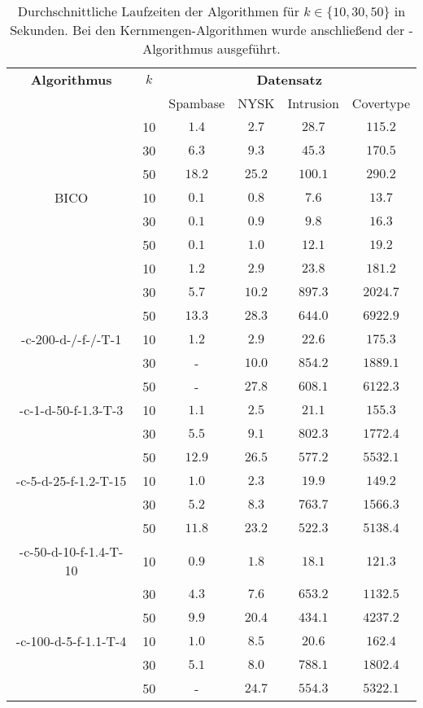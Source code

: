 \begin{table}[h]
\centering
\begin{tabular}{@{}cccccc@{}} \toprule
	\textbf{Algorithmus} & $k$ & \multicolumn{4}{c}{\textbf{Datensatz}} \\
	\cmidrule(r){3-6} & 		& Spambase 				& NYSK 				& Intrusion 			& Covertype \\ \toprule
	\Skmpp 						& 10 & $1.4$ 			& $2.7$ 			& $28.7$ 				& $115.2$ \\
		 						& 30 & $6.3$ 			& $9.3$ 			& $45.3$ 				& $170.5$ \\
		 						& 50 & $18.2$ 			& $25.2$ 			& $100.1$ 				& $290.2$ \\
	\midrule
	BICO 						& 10 & $0.1$ 			& $0.8$ 			& $7.6$ 				& $13.7$ \\
			 					& 30 & $0.1$ 			& $0.9$ 			& $9.8$ 				& $16.3$ \\
		 						& 50 & $0.1$ 			& $1.0$ 			& $12.1$ 				& $19.2$ \\
	\midrule
	\kmpp 						& 10 & $1.2$ 			& $2.9$ 			& $23.8$ 				& $181.2$ \\
			 					& 30 & $5.7$ 			& $10.2$ 			& $897.3$ 				& $2024.7$ \\
		 						& 50 & $13.3$ 			& $28.3$ 			& $644.0$ 				& $6922.9$ \\
	\midrule
	\CsTwo-c-200-d-/-f-/-T-1	& 10 & $1.2$			& $2.9$				& $22.6$ 				& $175.3$ \\
			 					& 30 & - 				& $10.0$			& $854.2$ 				& $1889.1$ \\
		 						& 50 & - 				& $27.8$			& $608.1$ 				& $6122.3$ \\
	\midrule
	\CsTwo-c-1-d-50-f-1.3-T-3	& 10 & $1.1$ 			& $2.5$ 			& $21.1$ 				& $155.3$ \\
			 					& 30 & $5.5$ 			& $9.1$ 			& $802.3$ 				& $1772.4$ \\
		 						& 50 & $12.9$ 			& $26.5$ 			& $577.2$ 				& $5532.1$ \\
	\midrule
	\CsTwo-c-5-d-25-f-1.2-T-15	& 10 & $1.0$ 			& $2.3$ 			& $19.9$ 				& $149.2$ \\
			 					& 30 & $5.2$ 			& $8.3$ 			& $763.7$ 				& $1566.3$ \\
		 						& 50 & $11.8$ 			& $23.2$ 			& $522.3$ 				& $5138.4$ \\
	\midrule
	\CsTwo-c-50-d-10-f-1.4-T-10	& 10 & $0.9$ 			& $1.8$ 			& $18.1$ 				& $121.3$ \\
			 					& 30 & $4.3$ 			& $7.6$ 			& $653.2$ 				& $1132.5$ \\
		 						& 50 & $9.9$ 			& $20.4$ 			& $434.1$ 				& $4237.2$ \\
	\midrule
	\CsTwo-c-100-d-5-f-1.1-T-4	& 10 & $1.0$ 			& $8.5$ 			& $20.6$ 				& $162.4$ \\
			 					& 30 & $5.1$ 			& $8.0$				& $788.1$ 				& $1802.4$ \\
		 						& 50 & - 				& $24.7$ 			& $554.3$ 				& $5322.1$ \\
	\bottomrule
\end{tabular}
\caption{Durchschnittliche Laufzeiten der Algorithmen für $k \in \{ 10, 30, 50 \}$ in Sekunden. Bei den
Kernmengen-Algorithmen wurde anschließend der \kmpp-Algorithmus ausgeführt.}
\label{tbl:experiment-coresets-runtime-kmpp}
\end{table}
